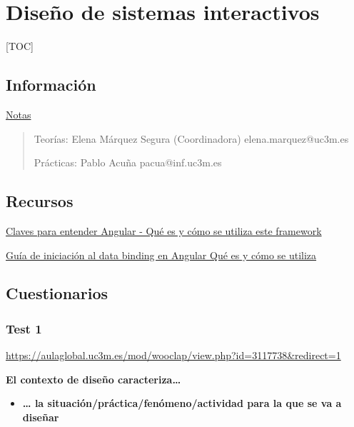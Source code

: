 \hypertarget{diseuxf1o-de-sistemas-interactivos}{%
\section{Diseño de sistemas
interactivos}\label{diseuxf1o-de-sistemas-interactivos}}

{[}TOC{]}

\hypertarget{informaciuxf3n}{%
\subsection{Información}\label{informaciuxf3n}}

\href{https://www.notion.so/Notas-fb736b1e411645c38c86aa930bfca7a4}{Notas}

\begin{quote}
Teorías: Elena Márquez Segura (Coordinadora) elena.marquez@uc3m.es

Prácticas: Pablo Acuña pacua@inf.uc3m.es
\end{quote}

\hypertarget{recursos}{%
\subsection{Recursos}\label{recursos}}

\href{https://www.acontracorrientech.com/claves-para-entender-angular-que-es-y-como-se-utiliza/}{Claves
para entender Angular - Qué es y cómo se utiliza este framework}

\href{https://www.acontracorrientech.com/guia-practica-del-databinding-en-angular/}{Guía
de iniciación al data binding en Angular \textbar{} Qué es y cómo se
utiliza}

\hypertarget{cuestionarios}{%
\subsection{Cuestionarios}\label{cuestionarios}}

\hypertarget{test-1}{%
\subsubsection{Test 1}\label{test-1}}

\url{https://aulaglobal.uc3m.es/mod/wooclap/view.php?id=3117738\&redirect=1}

\textbf{El contexto de diseño caracteriza\ldots{}}

\begin{itemize}
\tightlist
\item
  \textbf{\ldots{} la situación/práctica/fenómeno/actividad para la que
  se va a diseñar}
\end{itemize}

